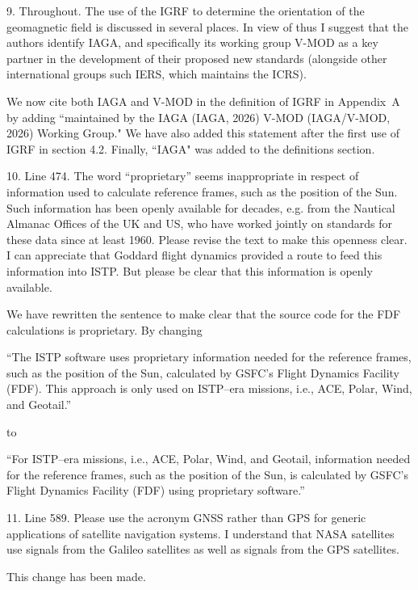 \documentclass[11pt]{article}
\begin{document}
9. Throughout. The use of the IGRF to determine the orientation of the geomagnetic field is discussed in several places. In view of thus I suggest that the authors identify IAGA, and specifically its working group V-MOD as a key partner in the development of their proposed new standards (alongside other international groups such IERS, which maintains the ICRS).
\\
{\color{violet}
\begin{leftbar}
We now cite both IAGA and V-MOD in the definition of IGRF in Appendix~A by adding ``maintained by the IAGA (IAGA, 2026) V-MOD (IAGA/V-MOD, 2026) Working Group." We have also added this statement after the first use of IGRF in section 4.2. Finally, ``IAGA" was added to the definitions section.
\end{leftbar}
}

10. Line 474. The word “proprietary” seems inappropriate in respect of information used to calculate reference frames, such as the position of the Sun. Such information has been openly available for decades, e.g. from the Nautical Almanac Offices of the UK and US, who have worked jointly on standards for these data since at least 1960. Please revise the text to make this openness clear. I can appreciate that Goddard flight dynamics provided a route to feed this information into ISTP. But please be clear that this information is openly available.
\\
{\color{violet}
\begin{leftbar}
We have rewritten the sentence to make clear that the source code for the FDF calculations is proprietary. By changing

``The ISTP software uses proprietary information needed for the reference frames, such as the position of the Sun, calculated by GSFC's Flight Dynamics Facility (FDF).  This approach is only used on ISTP--era missions, i.e., ACE, Polar, Wind, and Geotail.''

to

``For ISTP--era missions, i.e., ACE, Polar, Wind, and Geotail, information needed for the reference frames, such as the position of the Sun, is calculated by GSFC's Flight Dynamics Facility (FDF) using proprietary software.''

\end{leftbar}
}

11. Line 589. Please use the acronym GNSS rather than GPS for generic applications of satellite navigation systems. I understand that NASA satellites use signals from the Galileo satellites as well as signals from the GPS satellites.
\\
{\color{violet}
\begin{leftbar}
This change has been made.
\end{leftbar}
}
\end{document}
